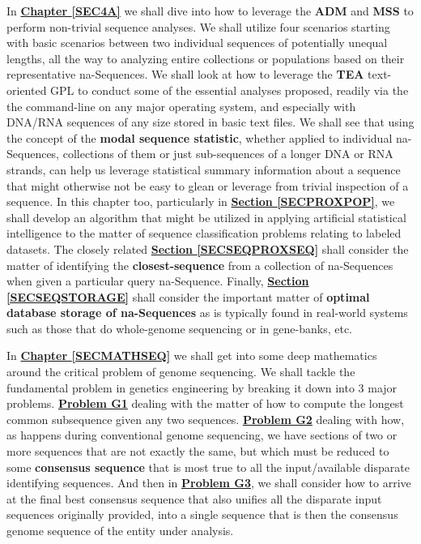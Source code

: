 \documentclass[a4paper, 18pt]{book} %
\begin{document}
In \textbf{\hyperref[SEC4A]{Chapter \ref{SEC4A}}} we shall dive into how to leverage the \textbf{ADM} and \textbf{MSS} to perform non-trivial sequence analyses. We shall utilize four scenarios starting with basic scenarios between two individual sequences of potentially unequal lengths, all the way to analyzing entire collections or populations based on their representative na-Sequences. We shall look at how to leverage the \textbf{TEA}\cite{Lutalo2024_taz}\cite{cli_tttt} text-oriented GPL to conduct some of the essential analyses proposed, readily via the the command-line on any major operating system, and especially with DNA/RNA sequences of any size stored in basic text files. We shall see that using the concept of the \textbf{modal sequence statistic}, whether applied to individual na-Sequences, collections of them or just sub-sequences of a longer DNA or RNA strands, can help us leverage statistical summary information about a sequence that might otherwise not be easy to glean or leverage from trivial inspection of a sequence. In this chapter too, particularly in \textbf{\hyperref[SECPROXPOP]{Section \ref{SECPROXPOP}}}, we shall develop an algorithm that might be utilized in applying artificial statistical intelligence to the matter of sequence classification problems relating to labeled datasets. The closely related \textbf{\hyperref[SECSEQPROXSEQ]{Section \ref{SECSEQPROXSEQ}}} shall consider the matter of identifying the \textbf{closest-sequence} from a collection of na-Sequences when given a particular query na-Sequence. Finally, \textbf{\hyperref[SECSEQSTORAGE]{Section \ref{SECSEQSTORAGE}}} shall consider the important matter of \textbf{optimal database storage of na-Sequences} as is typically found in real-world systems such as those that do whole-genome sequencing or in gene-banks, etc. 

In \textbf{\hyperref[SECMATHSEQ]{Chapter \ref{SECMATHSEQ}}} we shall get into some deep mathematics around the critical problem of genome sequencing. We shall tackle the fundamental problem in genetics engineering by breaking it down into 3 major problems. \textbf{\hyperref[PROBG1]{Problem G1}} dealing with the matter of how to compute the longest common subsequence given any two sequences. \textbf{\hyperref[PROBG2]{Problem G2}} dealing with how, as happens during conventional genome sequencing, we have sections of two or more sequences that are not exactly the same, but which must be reduced to some \textbf{consensus sequence} that is most true to all the input/available disparate identifying sequences. And then in \textbf{\hyperref[SECCOMPGENSEQ]{Problem G3}}, we shall consider how to arrive at the final best consensus sequence that also unifies all the disparate input sequences originally provided, into a single sequence that is then the consensus genome sequence of the entity under analysis.
\end{document}
